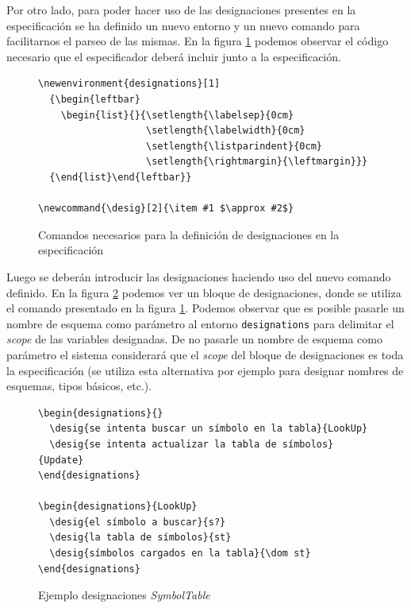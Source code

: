 Por otro lado, para poder hacer uso de las designaciones presentes en la especificación se ha definido un nuevo entorno y un nuevo comando para facilitarnos el parseo de las mismas. En la figura \ref{img:comandos_designaciones} podemos observar el código necesario que el especificador deberá incluir junto a la especificación.

\begin{figure}[H]
\centering
\begin{Verbatim}[frame=single,fontsize=\scriptsize]
\newenvironment{designations}[1]
  {\begin{leftbar}
    \begin{list}{}{\setlength{\labelsep}{0cm}
                   \setlength{\labelwidth}{0cm}
                   \setlength{\listparindent}{0cm}
                   \setlength{\rightmargin}{\leftmargin}}}
  {\end{list}\end{leftbar}}

\newcommand{\desig}[2]{\item #1 $\approx #2$}
\end{Verbatim}
\caption{Comandos necesarios para la definición de designaciones en la especificación}
\label{img:comandos_designaciones}
\end{figure}

Luego se deberán introducir las designaciones haciendo uso del nuevo comando definido. En la figura \ref{ej:comandos_designaciones} podemos ver un bloque de designaciones, donde se utiliza el comando presentado en la figura \ref{img:comandos_designaciones}. Podemos observar que es posible pasarle un nombre de esquema como parámetro al entorno \texttt{designations} para delimitar el \textit{scope} de las variables designadas. De no pasarle un nombre de esquema como parámetro el sistema considerará que el \textit{scope} del bloque de designaciones es toda la especificación (se utiliza esta alternativa por ejemplo para designar nombres de esquemas, tipos básicos, etc.).

\begin{figure}[H]
\centering
\begin{Verbatim}[frame=single,fontsize=\scriptsize]
\begin{designations}{}
  \desig{se intenta buscar un símbolo en la tabla}{LookUp}
  \desig{se intenta actualizar la tabla de símbolos}{Update}
\end{designations}

\begin{designations}{LookUp}
  \desig{el símbolo a buscar}{s?}
  \desig{la tabla de símbolos}{st}
  \desig{símbolos cargados en la tabla}{\dom st}
\end{designations}
\end{Verbatim}
\caption{Ejemplo designaciones \textit{SymbolTable}}
\label{ej:comandos_designaciones}
\end{figure}

